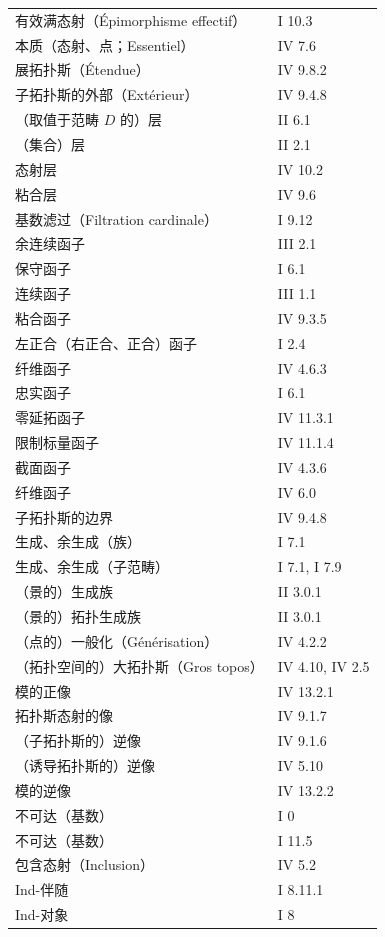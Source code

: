 \begin{longtable}{@{}p{}p{}@{}}
有效满态射（Épimorphisme effectif） & I 10.3\\
本质（态射、点；Essentiel） & IV 7.6\\
展拓扑斯（Étendue） & IV 9.8.2\\
子拓扑斯的外部（Extérieur） & IV 9.4.8\\[3pt]
（取值于范畴 $D$ 的）层 & II 6.1\\
（集合）层 & II 2.1\\
态射层 & IV 10.2\\
粘合层 & IV 9.6\\
基数滤过（Filtration cardinale） & I 9.12\\
余连续函子 & III 2.1\\
保守函子 & I 6.1\\
连续函子 & III 1.1\\
粘合函子 & IV 9.3.5\\
左正合（右正合、正合）函子 & I 2.4\\
纤维函子 & IV 4.6.3\\
忠实函子 & I 6.1\\
零延拓函子 & IV 11.3.1\\
限制标量函子 & IV 11.1.4\\
截面函子 & IV 4.3.6\\
纤维函子 & IV 6.0\\
子拓扑斯的边界 & IV 9.4.8\\[3pt]
生成、余生成（族） & I 7.1\\
生成、余生成（子范畴） & I 7.1, I 7.9\\
（景的）生成族 & II 3.0.1\\
（景的）拓扑生成族 & II 3.0.1\\
（点的）一般化（Générisation） & IV 4.2.2\\
（拓扑空间的）大拓扑斯（Gros topos） & IV 4.10, IV 2.5\\[3pt]
模的正像 & IV 13.2.1\\
拓扑斯态射的像 & IV 9.1.7\\
（子拓扑斯的）逆像 & IV 9.1.6\\
（诱导拓扑斯的）逆像 & IV 5.10\\
模的逆像 & IV 13.2.2\\
不可达（基数） & I $0$\\
不可达（基数） & I 11.5\\
包含态射（Inclusion） & IV 5.2\\
Ind-伴随 & I 8.11.1\\
Ind-对象 & I 8\\
\end{longtable}
